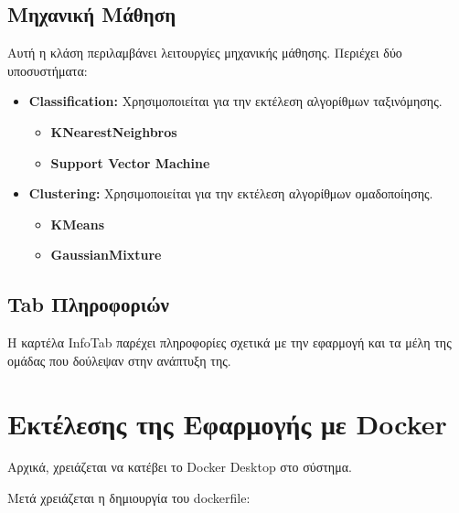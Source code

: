 \documentclass{article}
\begin{document}
\subsection{Μηχανική Μάθηση}

Αυτή η κλάση περιλαμβάνει λειτουργίες μηχανικής μάθησης. Περιέχει δύο υποσυστήματα:

\begin{itemize}
  \item \textbf{Classification:} Χρησιμοποιείται για την εκτέλεση αλγορίθμων ταξινόμησης.
  \begin{itemize}
    \item \textbf{KNearestNeighbros}
    \item \textbf{Support Vector Machine}
  \end{itemize}
  \item \textbf{Clustering:} Χρησιμοποιείται για την εκτέλεση αλγορίθμων ομαδοποίησης.
  \begin{itemize}
    \item \textbf{KMeans}
    \item \textbf{GaussianMixture}
  \end{itemize}
\end{itemize}

\subsection{Tab Πληροφοριών}

Η καρτέλα InfoTab παρέχει πληροφορίες σχετικά με την εφαρμογή και τα μέλη της ομάδας που δούλεψαν στην ανάπτυξη της.

\newpage

\section{Εκτέλεσης της Εφαρμογής με Docker}
Αρχικά, χρειάζεται να κατέβει το Docker Desktop στο σύστημα.

Μετά χρειάζεται η δημιουργία του dockerfile:
\vspace{0.3 cm}
\end{document}
